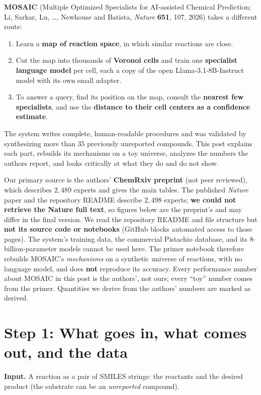 \documentclass[11pt]{article}
\begin{document}
\textbf{MOSAIC} (Multiple Optimized Specialists for AI-assisted Chemical Prediction; Li, Sarkar, Lu, \ldots, Newhouse and Batista, \emph{Nature} \textbf{651}, 107, 2026) takes a different route:
\begin{enumerate}[nosep]
  \item Learn a \textbf{map of reaction space}, in which similar reactions are close.
  \item Cut the map into thousands of \textbf{Voronoi cells} and train one \textbf{specialist language model} per cell, each a copy of the open Llama-3.1-8B-Instruct model with its own small adapter.
  \item To answer a query, find its position on the map, consult the \textbf{nearest few specialists}, and use the \textbf{distance to their cell centers as a confidence estimate}.
\end{enumerate}
The system writes complete, human-readable procedures and was validated by synthesizing more than $35$ previously unreported compounds. This post explains each part, rebuilds its mechanisms on a toy universe, analyzes the numbers the authors report, and looks critically at what they do and do not show.

\begin{keybox}
Our primary source is the authors' \textbf{ChemRxiv preprint} (not peer reviewed), which describes $2{,}489$ experts and gives the main tables. The published \emph{Nature} paper and the repository README describe $2{,}498$ experts; \textbf{we could not retrieve the Nature full text}, so figures below are the preprint's and may differ in the final version. We read the repository README and file structure but \textbf{not its source code or notebooks} (GitHub blocks automated access to those pages). The system's training data, the commercial Pistachio database, and its $8$-billion-parameter models cannot be used here. The primer notebook therefore rebuilds MOSAIC's \emph{mechanisms} on a synthetic universe of reactions, with no language model, and does \textbf{not} reproduce its accuracy. Every performance number about MOSAIC in this post is the authors', not ours; every ``toy'' number comes from the primer. Quantities we derive from the authors' numbers are marked as derived.
\end{keybox}

\section{Step 1: What goes in, what comes out, and the data}
\textbf{Input.} A reaction as a pair of SMILES strings: the reactants and the desired product (the substrate can be an \emph{unreported} compound).
\end{document}
